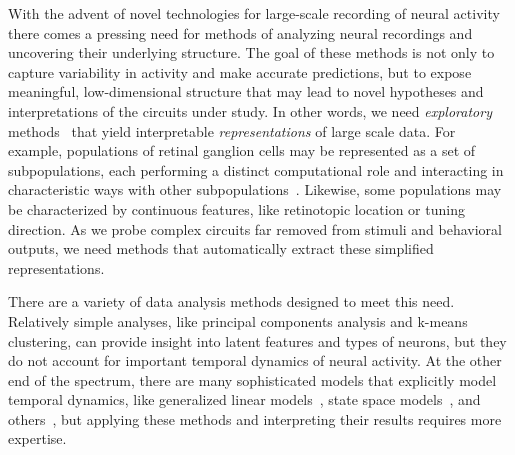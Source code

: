 With the advent of novel technologies for large-scale recording of
neural activity~\cite{grewe2010high, prevedel2014simultaneous,
  churchland2012neural, holekamp2008fast, ahrens2013whole,
  portugues2014whole, alivisatos2012brain, briggman2005optical,
  ahrens2012brain} there comes a pressing need for methods of
analyzing neural recordings and uncovering their underlying structure.
The goal of these methods is not only to capture variability in
activity and make accurate predictions, but to expose meaningful,
low-dimensional structure that may lead to novel hypotheses and
interpretations of the circuits under study. In other words, we
need \emph{exploratory} methods~\cite{tukey1962future} that yield interpretable
\emph{representations} of large scale data.  
For example, populations of retinal ganglion cells may be represented as a 
set of subpopulations, each performing a distinct
computational role and interacting in characteristic ways with
other subpopulations~\cite{sanes2015types}.
Likewise, some populations may be characterized by continuous features,
like retinotopic location or tuning direction.
As we probe complex circuits far removed from stimuli and behavioral
outputs, we need methods that automatically extract these simplified
representations.

There are a variety of data analysis methods designed to meet this
need.  Relatively simple analyses, like principal components analysis
and k-means clustering, 
can provide insight into latent features and types of neurons, but they do 
not account for important temporal dynamics of neural activity. 
At the other end of the
spectrum, there are many sophisticated models that explicitly model
temporal dynamics, like generalized linear models~\cite{Truccolo-2005,
  Paninski-2004, Pillow-2008}, state space models~\cite{Smith-2003,
  paninski2010new, Buesing12, escola2011hidden,
  linderman2016nonparametric}, and others~\cite{Yu09,
  churchland2012neural, cunningham2007inferring},
but applying these methods and interpreting their results requires
more expertise. 

